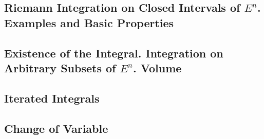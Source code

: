 \documentclass{article}
\begin{document}
		\subsection{Riemann Integration on Closed Intervals of $E^n$. Examples and Basic Properties}
		
		\subsection{Existence of the Integral. Integration on Arbitrary Subsets of $E^n$. Volume}
		
		\subsection{Iterated Integrals}
		
		\subsection{Change of Variable}


	
\end{document}
